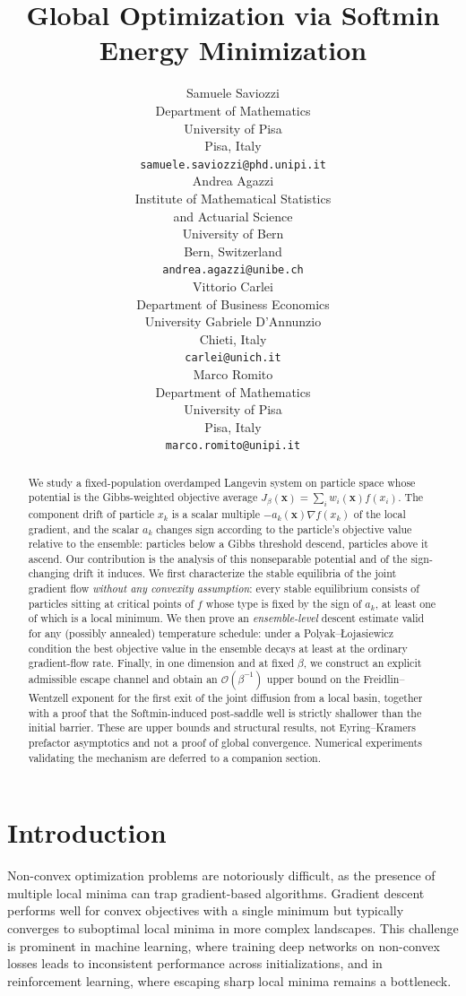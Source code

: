 \documentclass{article}
\title{Global Optimization via Softmin Energy Minimization}
\author{
Samuele Saviozzi \\
Department of Mathematics\\
University of Pisa\\
Pisa, Italy \\
\texttt{samuele.saviozzi@phd.unipi.it} \\
\And
Andrea Agazzi \\
Institute of Mathematical Statistics \\and Actuarial Science\\
University of Bern\\
Bern, Switzerland\\
\texttt{andrea.agazzi@unibe.ch} \\
\AND
Vittorio Carlei \\
Department of Business Economics\\
University Gabriele D'Annunzio\\
Chieti, Italy \\
\texttt{carlei@unich.it} \\
\And
Marco Romito \\
Department of Mathematics\\
University of Pisa\\
Pisa, Italy \\
\texttt{marco.romito@unipi.it} \\
}
\theoremstyle{plain}
\theoremstyle{definition}
\theoremstyle{remark}
\newcommand{\xx}{\mathbf{x}}
\begin{document}
\maketitle

\begin{abstract}
We study a fixed-population overdamped Langevin system on particle space whose potential is the Gibbs-weighted objective average \(J_\beta(\xx)=\sum_i w_i(\xx)f(x_i)\). The component drift of particle \(x_k\) is a scalar multiple \(-a_k(\xx)\nabla f(x_k)\) of the local gradient, and the scalar \(a_k\) changes sign according to the particle's objective value relative to the ensemble: particles below a Gibbs threshold descend, particles above it ascend. Our contribution is the analysis of this nonseparable potential and of the sign-changing drift it induces. We first characterize the stable equilibria of the joint gradient flow \emph{without any convexity assumption}: every stable equilibrium consists of particles sitting at critical points of \(f\) whose type is fixed by the sign of \(a_k\), at least one of which is a local minimum. We then prove an \emph{ensemble-level} descent estimate valid for any (possibly annealed) temperature schedule: under a Polyak--\L{}ojasiewicz condition the best objective value in the ensemble decays at least at the ordinary gradient-flow rate. Finally, in one dimension and at fixed \(\beta\), we construct an explicit admissible escape channel and obtain an \(\mathcal O(\beta^{-1})\) upper bound on the Freidlin--Wentzell exponent for the first exit of the joint diffusion from a local basin, together with a proof that the Softmin-induced post-saddle well is strictly shallower than the initial barrier. These are upper bounds and structural results, not Eyring--Kramers prefactor asymptotics and not a proof of global convergence. Numerical experiments validating the mechanism are deferred to a companion section.
\end{abstract}

\section{Introduction}
\label{sec:intro}

Non-convex optimization problems are notoriously difficult, as the presence of multiple local minima can trap gradient-based algorithms. Gradient descent performs well for convex objectives with a single minimum but typically converges to suboptimal local minima in more complex landscapes. This challenge is prominent in machine learning, where training deep networks on non-convex losses leads to inconsistent performance across initializations, and in reinforcement learning, where escaping sharp local minima remains a bottleneck.
\end{document}
